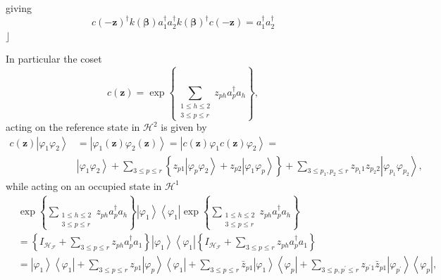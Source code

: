 \documentclass[aps,preprint]{revtex4}%
\begin{document}
giving
\begin{equation}
c\left(  -\mathbf{z}\right)  ^{\dagger}k\left(  \mathbf{\beta}\right)
a_{1}^{\dagger}a_{2}^{\dagger}k\left(  \mathbf{\beta}\right)  ^{\dagger
}c\left(  -\mathbf{z}\right)  =a_{1}^{\dagger}a_{2}^{\dagger}%
\end{equation}
$\rfloor$

In particular the coset
\begin{equation}
c\left(  \mathbf{z}\right)  =\exp\left\{  \sum\limits_{\substack{1\leq
h\leq2\\3\leq p\leq r}}z_{ph}a_{p}^{\dagger}a_{h}\right\}  ,\nonumber
\end{equation}
acting on the reference state in $\mathcal{H}^{2}$ is given by%
\begin{align}
c\left(  \mathbf{z}\right)  \left\vert \varphi_{1}\varphi_{2}\right\rangle  &
=\left\vert \varphi_{1}\left(  \mathbf{z}\right)  \varphi_{2}\left(
\mathbf{z}\right)  \right\rangle =\left\vert c\left(  \mathbf{z}\right)
\varphi_{1}c\left(  \mathbf{z}\right)  \varphi_{2}\right\rangle =\nonumber\\
&  \left\vert \varphi_{1}\varphi_{2}\right\rangle +\sum\limits_{3\leq p\leq
r}\left\{  z_{p1}\left\vert \varphi_{p}\varphi_{2}\right\rangle +z_{p2}%
\left\vert \varphi_{1}\varphi_{p}\right\rangle \right\}  +\sum\limits_{3\leq
p_{1},p_{2}\leq r}z_{p_{1}1}z_{p_{2}2}\left\vert \varphi_{p_{1}}\varphi
_{p_{2}}\right\rangle ,
\end{align}
while acting on an occupied state in $\mathcal{H}^{1}$
\begin{align}
&  \exp\left\{  \sum\limits_{\substack{1\leq h\leq2\\3\leq p\leq r}%
}z_{ph}a_{p}^{\dagger}a_{h}\right\}  \left\vert \varphi_{1}\right\rangle
\left\langle \varphi_{1}\right\vert \exp\left\{  \sum\limits_{\substack{1\leq
h\leq2\\3\leq p\leq r}}z_{ph}a_{p}^{\dagger}a_{h}\right\} \nonumber\\
&  =\left\{  I_{\mathcal{H}_{\mathcal{F}}}+\sum\limits_{3\leq p\leq r}%
z_{ph}a_{p}^{\dagger}a_{1}\right\}  \left\vert \varphi_{1}\right\rangle
\left\langle \varphi_{1}\right\vert \left\{  I_{\mathcal{H}_{\mathcal{F}}%
}+\sum\limits_{3\leq p\leq r}z_{ph}a_{p}^{\dagger}a_{1}\right\} \nonumber\\
&  =\left\vert \varphi_{1}\right\rangle \left\langle \varphi_{1}\right\vert
+\sum\limits_{3\leq p\leq r}z_{p1}\left\vert \varphi_{p}\right\rangle
\left\langle \varphi_{1}\right\vert +\sum\limits_{3\leq p\leq r}\bar{z}%
_{p1}\left\vert \varphi_{1}\right\rangle \left\langle \varphi_{p}\right\vert
+\sum\limits_{3\leq p,p^{\prime}\leq r}z_{p^{\prime}1}\bar{z}_{p1}\left\vert
\varphi_{p^{\prime}}\right\rangle \left\langle \varphi_{p}\right\vert ,
\end{align}
\end{document}
